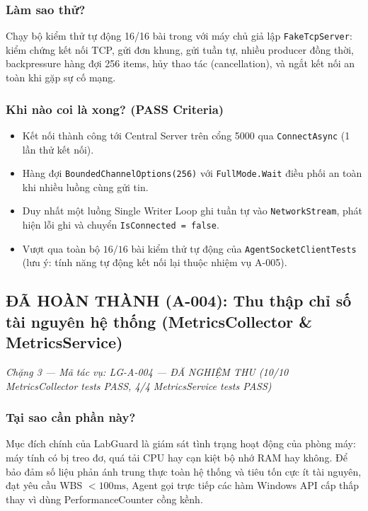 \documentclass[12pt,a4paper]{article}
\begin{document}
\subsubsection{Làm sao thử?}
Chạy bộ kiểm thử tự động 16/16 bài trong  với máy chủ giả lập \texttt{FakeTcpServer}: kiểm chứng kết nối TCP, gửi đơn khung, gửi tuần tự, nhiều producer đồng thời, backpressure hàng đợi 256 items, hủy thao tác (cancellation), và ngắt kết nối an toàn khi gặp sự cố mạng.

\subsubsection{Khi nào coi là xong? (PASS Criteria)}
\begin{itemize}
  \item Kết nối thành công tới Central Server trên cổng 5000 qua \texttt{ConnectAsync} (1 lần thử kết nối).
  \item Hàng đợi \texttt{BoundedChannelOptions(256)} với \texttt{FullMode.Wait} điều phối an toàn khi nhiều luồng cùng gửi tin.
  \item Duy nhất một luồng Single Writer Loop ghi tuần tự vào \texttt{NetworkStream}, phát hiện lỗi ghi và chuyển \texttt{IsConnected = false}.
  \item Vượt qua toàn bộ $16/16$ bài kiểm thử tự động của \texttt{AgentSocketClientTests} (lưu ý: tính năng tự động kết nối lại thuộc nhiệm vụ A-005).
\end{itemize}

\subsection{ĐÃ HOÀN THÀNH (A-004): Thu thập chỉ số tài nguyên hệ thống (MetricsCollector \& MetricsService)}
{\footnotesize\color{lgGray}\textit{Chặng 3 — Mã tác vụ: LG-A-004 — ĐÃ NGHIỆM THU (10/10 MetricsCollector tests PASS, 4/4 MetricsService tests PASS)}}\par
\vspace{2mm}

\subsubsection{Tại sao cần phần này?}
Mục đích chính của LabGuard là giám sát tình trạng hoạt động của phòng máy: máy tính có bị treo đơ, quá tải CPU hay cạn kiệt bộ nhớ RAM hay không. Để bảo đảm số liệu phản ánh trung thực toàn hệ thống và tiêu tốn cực ít tài nguyên, đạt yêu cầu WBS $< 100\text{ms}$, Agent gọi trực tiếp các hàm Windows API cấp thấp thay vì dùng PerformanceCounter cồng kềnh.
\end{document}
